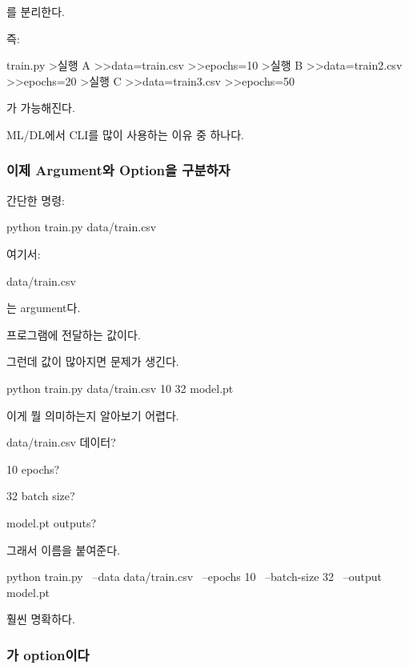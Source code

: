 를 분리한다.

즉:

\begin{dhkdir}[in=8]
train.py
>실행 A
>>data=train.csv
>>epochs=10
>실행 B
>>data=train2.csv
>>epochs=20
>실행 C
>>data=train3.csv
>>epochs=50
\end{dhkdir}

가 가능해진다.

ML/DL에서 CLI를 많이 사용하는 이유 중 하나다.

\subsubsection{이제 Argument와 Option을 구분하자}

간단한 명령:

\begin{dhkzsh}
python train.py data/train.csv
\end{dhkzsh}

여기서:

\begin{dhkzsh}
data/train.csv
\end{dhkzsh}

는 argument다.

프로그램에 전달하는 값이다.

그런데 값이 많아지면 문제가 생긴다.

\begin{dhkzsh}
python train.py data/train.csv 10 32 model.pt
\end{dhkzsh}

이게 뭘 의미하는지 알아보기 어렵다.

\begin{dhksmry}[centered]
data/train.csv \ra 데이터?

10 \ra epochs?

32 \ra batch size?

model.pt \ra outputs?
\end{dhksmry}

그래서 이름을 붙여준다.

\begin{dhkzsh}
python train.py \
    --data data/train.csv \
    --epochs 10 \
    --batch-size 32 \
    --output model.pt
\end{dhkzsh}

훨씬 명확하다.

\subsubsection{가 option이다}

